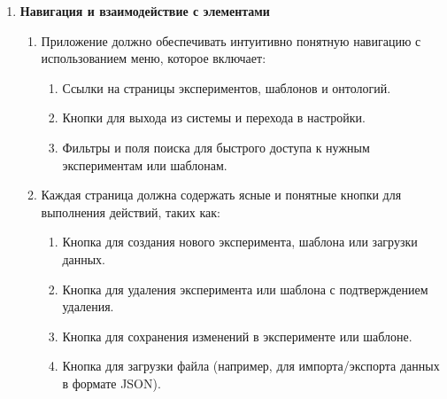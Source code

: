 \documentclass[a4paper,12pt,reqno]{article}
\begin{document}
\begin{enumerate}
        \item \textbf{Навигация и взаимодействие с элементами}
        \begin{enumerate}[label=\arabic{enumi}.\arabic*.]
            \item Приложение должно обеспечивать интуитивно понятную навигацию с использованием меню, которое включает:
            \begin{enumerate}[label=\arabic{enumi}.\arabic{enumii}.\arabic*.]
                \item Ссылки на страницы экспериментов, шаблонов и онтологий.
                \item Кнопки для выхода из системы и перехода в настройки.
                \item Фильтры и поля поиска для быстрого доступа к нужным экспериментам или шаблонам.
            \end{enumerate}
            \item Каждая страница должна содержать ясные и понятные кнопки для выполнения действий, таких как:
            \begin{enumerate}[label=\arabic{enumi}.\arabic{enumii}.\arabic*.]
                \item Кнопка для создания нового эксперимента, шаблона или загрузки данных.
                \item Кнопка для удаления эксперимента или шаблона с подтверждением удаления.
                \item Кнопка для сохранения изменений в эксперименте или шаблоне.
                \item Кнопка для загрузки файла (например, для импорта/экспорта данных в формате JSON).
            \end{enumerate}
        \end{enumerate}


\end{enumerate}
\end{document}
